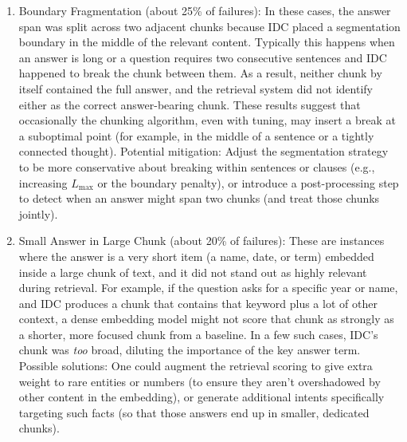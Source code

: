 \documentclass[12pt,a4paper]{report}
\begin{document}
\begin{enumerate}
\item Boundary Fragmentation (about 25\% of failures): In these cases, the answer span was split across two adjacent chunks because IDC placed a segmentation boundary in the middle of the relevant content. Typically this happens when an answer is long or a question requires two consecutive sentences and IDC happened to break the chunk between them. As a result, neither chunk by itself contained the full answer, and the retrieval system did not identify either as the correct answer-bearing chunk. These results suggest that occasionally the chunking algorithm, even with tuning, may insert a break at a suboptimal point (for example, in the middle of a sentence or a tightly connected thought). Potential mitigation: Adjust the segmentation strategy to be more conservative about breaking within sentences or clauses (e.g., increasing $L_{\max}$ or the boundary penalty), or introduce a post-processing step to detect when an answer might span two chunks (and treat those chunks jointly).

\item Small Answer in Large Chunk (about 20\% of failures): These are instances where the answer is a very short item (a name, date, or term) embedded inside a large chunk of text, and it did not stand out as highly relevant during retrieval. For example, if the question asks for a specific year or name, and IDC produces a chunk that contains that keyword plus a lot of other context, a dense embedding model might not score that chunk as strongly as a shorter, more focused chunk from a baseline. In a few such cases, IDC's chunk was \textit{too} broad, diluting the importance of the key answer term. Possible solutions: One could augment the retrieval scoring to give extra weight to rare entities or numbers (to ensure they aren't overshadowed by other content in the embedding), or generate additional intents specifically targeting such facts (so that those answers end up in smaller, dedicated chunks). 


\end{enumerate}
\end{document}
